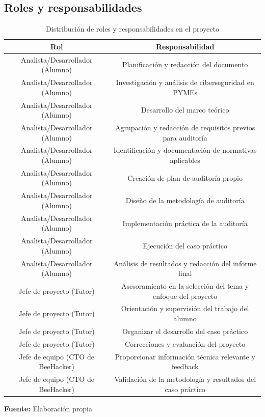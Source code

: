 \documentclass[a4paper, 10pt]{article}
\begin{document}
\subsection{Roles y responsabilidades}

\begin{table}[H]
    \centering
    \caption{Distribución de roles y responsabilidades en el proyecto}
    \begin{tabular}{|c|c|}

        \hline
        \textbf{Rol} & \textbf{Responsabilidad} \\
        \hline
        Analista/Desarrollador (Alumno) & Planificación y redacción del documento \\
        \hline
        Analista/Desarrollador (Alumno) & Investigación y análisis de ciberseguridad en PYMEs \\
        \hline
        Analista/Desarrollador (Alumno) & Desarrollo del marco teórico \\
        \hline
        Analista/Desarrollador (Alumno) & Agrupación y redacción de requisitos previos para auditoría \\
        \hline
        Analista/Desarrollador (Alumno) & Identificación y documentación de normativas aplicables \\
        \hline
        Analista/Desarrollador (Alumno) & Creación de plan de auditoría propio \\
        \hline
        Analista/Desarrollador (Alumno) & Diseño de la metodología de auditoría \\
        \hline
        Analista/Desarrollador (Alumno) & Implementación práctica de la auditoría \\
        \hline
        Analista/Desarrollador (Alumno) & Ejecución del caso práctico \\
        \hline
        Analista/Desarrollador (Alumno) & Análisis de resultados y redacción del informe final \\
        \hline
        Jefe de proyecto (Tutor) & Asesoramiento en la selección del tema y enfoque del proyecto \\
        \hline
        Jefe de proyecto (Tutor) & Orientación y supervisión del trabajo del alumno \\
        \hline
        Jefe de proyecto (Tutor) & Organizar el desarrollo del caso práctico \\
        \hline
        Jefe de proyecto (Tutor) & Correcciones y evaluación del proyecto \\
        \hline
        Jefe de equipo (CTO de BeeHacker) & Proporcionar información técnica relevante y feedback \\
        \hline
        Jefe de equipo (CTO de BeeHacker) & Validación de la metodología y resultados del caso práctico \\
        \hline

    \end{tabular}
    \begin{flushleft}\centering
        \footnotesize \textbf{Fuente:} Elaboración propia
    \end{flushleft}    
    \label{tab:distribucion_roles}
\end{table}
\end{document}
